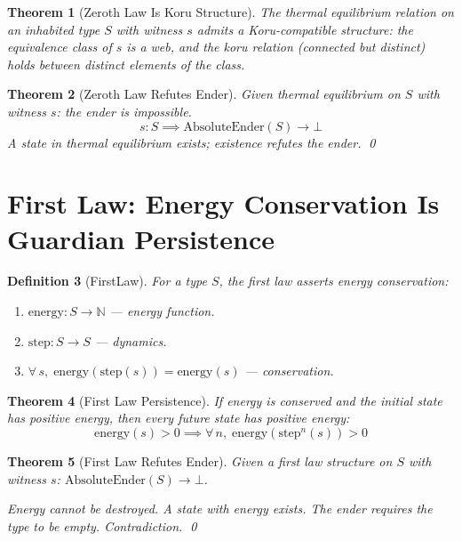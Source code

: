 \documentclass[12pt,a4paper]{article}
\newtheorem{theorem}{Theorem}[section]
\newtheorem{definition}[theorem]{Definition}
\begin{document}
\begin{theorem}[Zeroth Law Is Koru Structure]\label{thm:zeroth-koru}
The thermal equilibrium relation on an inhabited type $S$ with witness $s$
admits a Koru-compatible structure: the equivalence class of $s$ is a
web, and the koru relation (connected but distinct) holds between
distinct elements of the class.
\end{theorem}

\begin{theorem}[Zeroth Law Refutes Ender]\label{thm:zeroth-refute}
Given thermal equilibrium on $S$ with witness $s$: the ender is impossible.
\[
s : S \implies \text{AbsoluteEnder}(S) \to \bot
\]
A state in thermal equilibrium exists; existence refutes the ender. \qed
\end{theorem}

\section{First Law: Energy Conservation Is Guardian Persistence}

\begin{definition}[FirstLaw]
For a type $S$, the first law asserts energy conservation:
\begin{enumerate}
    \item $\text{energy} : S \to \mathbb{N}$ --- energy function.
    \item $\text{step} : S \to S$ --- dynamics.
    \item $\forall\, s,\; \text{energy}(\text{step}(s)) = \text{energy}(s)$ --- conservation.
\end{enumerate}
\end{definition}

\begin{theorem}[First Law Persistence]\label{thm:first-persist}
If energy is conserved and the initial state has positive energy,
then every future state has positive energy:
\[
\text{energy}(s) > 0 \implies \forall\, n,\; \text{energy}(\text{step}^n(s)) > 0
\]
\end{theorem}

\begin{theorem}[First Law Refutes Ender]\label{thm:first-refute}
Given a first law structure on $S$ with witness $s$:
$\text{AbsoluteEnder}(S) \to \bot$.

Energy cannot be destroyed. A state with energy exists. The ender
requires the type to be empty. Contradiction. \qed
\end{theorem}
\end{document}
